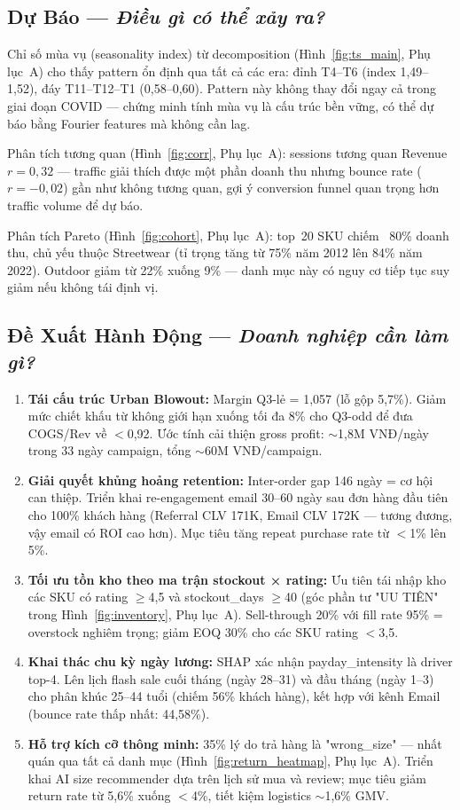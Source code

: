 \documentclass{article}
\begin{document}
\subsection{Dự Báo — \textit{Điều gì có thể xảy ra?}}

Chỉ số mùa vụ (seasonality index) từ decomposition (Hình~\ref{fig:ts_main}, Phụ lục~A) cho thấy pattern ổn định qua tất cả các era: đỉnh T4–T6 (index 1,49–1,52), đáy T11–T12–T1 (0,58–0,60). Pattern này không thay đổi ngay cả trong giai đoạn COVID — chứng minh tính mùa vụ là cấu trúc bền vững, có thể dự báo bằng Fourier features mà không cần lag.

Phân tích tương quan (Hình~\ref{fig:corr}, Phụ lục~A): sessions tương quan Revenue $r=0,32$ — traffic giải thích được một phần doanh thu nhưng bounce rate ($r=-0,02$) gần như không tương quan, gợi ý conversion funnel quan trọng hơn traffic volume để dự báo.

Phân tích Pareto (Hình~\ref{fig:cohort}, Phụ lục~A): top~20 SKU chiếm ~80\% doanh thu, chủ yếu thuộc Streetwear (tỉ trọng tăng từ 75\% năm 2012 lên 84\% năm 2022). Outdoor giảm từ 22\% xuống 9\% — danh mục này có nguy cơ tiếp tục suy giảm nếu không tái định vị.

\subsection{Đề Xuất Hành Động — \textit{Doanh nghiệp cần làm gì?}}

\begin{enumerate}
  \item \textbf{Tái cấu trúc Urban Blowout:} Margin Q3-lẻ = 1,057 (lỗ gộp 5,7\%). Giảm mức chiết khấu từ không giới hạn xuống tối đa 8\% cho Q3-odd để đưa COGS/Rev về $<$0,92. Ước tính cải thiện gross profit: $\sim$1,8M VNĐ/ngày trong 33 ngày campaign, tổng $\sim$60M VNĐ/campaign.
  \item \textbf{Giải quyết khủng hoảng retention:} Inter-order gap 146 ngày = cơ hội can thiệp. Triển khai re-engagement email 30–60 ngày sau đơn hàng đầu tiên cho 100\% khách hàng (Referral CLV 171K, Email CLV 172K — tương đương, vậy email có ROI cao hơn). Mục tiêu tăng repeat purchase rate từ $<$1\% lên 5\%.
  \item \textbf{Tối ưu tồn kho theo ma trận stockout × rating:} Ưu tiên tái nhập kho các SKU có rating $\geq$4,5 và stockout\_days $\geq$40 (góc phần tư "UU TIÊN" trong Hình~\ref{fig:inventory}, Phụ lục~A). Sell-through 20\% với fill rate 95\% = overstock nghiêm trọng; giảm EOQ 30\% cho các SKU rating $<$3,5.
  \item \textbf{Khai thác chu kỳ ngày lương:} SHAP xác nhận payday\_intensity là driver top-4. Lên lịch flash sale cuối tháng (ngày 28–31) và đầu tháng (ngày 1–3) cho phân khúc 25–44 tuổi (chiếm 56\% khách hàng), kết hợp với kênh Email (bounce rate thấp nhất: 44,58\%).
  \item \textbf{Hỗ trợ kích cỡ thông minh:} 35\% lý do trả hàng là "wrong\_size" — nhất quán qua tất cả danh mục (Hình~\ref{fig:return_heatmap}, Phụ lục~A). Triển khai AI size recommender dựa trên lịch sử mua và review; mục tiêu giảm return rate từ 5,6\% xuống $<$4\%, tiết kiệm logistics $\sim$1,6\% GMV.
\end{enumerate}
\end{document}
